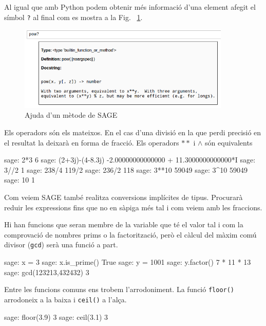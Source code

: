 Al igual que amb Python podem obtenir més informació d'una element afegit el símbol {\tt ?} al final com es mostra a la Fig. ~\ref{fig:shelp}.



\begin{figure}[!h]
    \begin{centering}
    \includegraphics[width=0.9\textwidth]{img/shelp.png}
    \caption{Ajuda d'un mètode de SAGE}
    \label{fig:shelp}
    \end{centering}
\end{figure}

Els operadors són els mateixos. En el cas d'una divisió en la que perdi precisió en el resultat la deixarà en forma de fracció. Els operadors $**$ i $\wedge$ són equivalents

\begin{blockcode}
sage: 2*3
6
sage: (2+3j)-(4-8.3j)
-2.00000000000000 + 11.3000000000000*I
sage: 3//2
1
sage: 238/4
119/2
sage: 236/2
118
sage: 3**10
59049
sage: 3^10
59049
sage: 10%
1
\end{blockcode}

Com veiem SAGE també realitza conversions implícites de tipus. Procurarà reduir les expressions fins que no en sàpiga més tal i com veiem amb les fraccions.

Hi han funcions que seran membre de la variable que té el valor tal i com la comprovació de nombres prims o la factorització, però el càlcul del màxim comú divisor ({\tt gcd}) serà una funció a part.

\begin{blockcode}
sage: x = 3
sage: x.is_prime()
True
sage: y = 1001
sage: y.factor()
7 * 11 * 13
sage: gcd(123213,432432)
3
\end{blockcode}

Entre les funcions comuns ens trobem l'arrodoniment. La funció {\tt floor()} arrodoneix a la baixa i {\tt ceil()} a l'alça.

\begin{blockcode}
sage: floor(3.9)
3
sage: ceil(3.1)
3
\end{blockcode}

